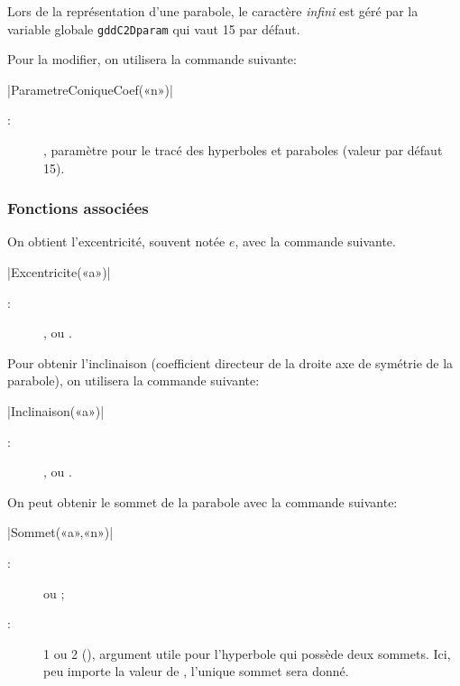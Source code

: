 \documentclass[a4paper,french]{article}
\begin{document}
Lors de la représentation d'une parabole, le caractère \emph{infini} est géré
par la variable globale \lstinline+gddC2Dparam+ qui vaut 15 par défaut. 

Pour la modifier, on utilisera la commande suivante:
\begin{colourband}
\macro|ParametreConiqueCoef(«n»)|
\begin{description}
  \item[:] , paramètre pour le tracé des hyperboles et
  paraboles (valeur par défaut 15). 
\end{description}
\end{colourband}

\subsubsection{Fonctions associées}


On obtient l'excentricité, souvent notée $e$, avec la commande suivante.

\begin{colourband}
\macro|Excentricite(«a»)|
\begin{description}
  \item[:]  ,  ou .
\end{description}
\end{colourband}
\bigskip


Pour obtenir l'inclinaison (coefficient directeur de la droite axe de symétrie
de la parabole), on utilisera la commande suivante:

\begin{colourband}
\macro|Inclinaison(«a»)|
\begin{description}
  \item[:]  ,  ou .
\end{description}
\end{colourband}
\bigskip

On peut obtenir le sommet de la parabole avec la commande suivante:

\begin{colourband}
\macro|Sommet(«a»,«n»)|
\begin{description}
  \item[:]   ou  ;
  \item[:]  1 ou 2 (), argument utile pour l'hyperbole
  qui possède deux sommets. Ici, peu importe la valeur de , l'unique
  sommet sera donné.
\end{description}
\end{colourband}
\bigskip
\end{document}
